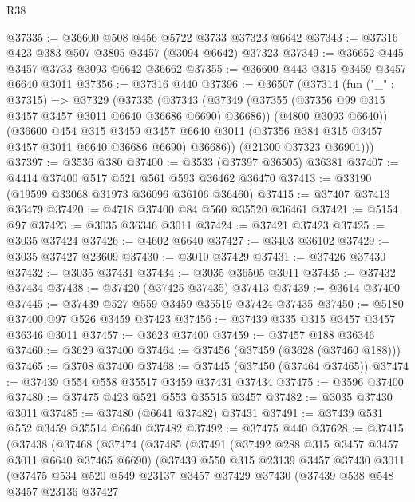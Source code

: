 \begin{lexlean}{R38}
\begin{coremodule}
@37335 := @36600 @508 @456 @5722 @3733 @37323 @6642
@37343 := @37316 @423 @383 @507 @3805 @3457 (@3094 @6642) @37323
@37349 := @36652 @445 @3457 @3733 @3093 @6642 @36662
@37355 := @36600 @443 @315 @3459 @3457 @6640 @3011
@37356 := @37316 @440
@37396 := @36507
    (@37314
      (fun ("_" : @37315) =>
      @37329
        (@37335
          (@37343
            (@37349 (@37355 (@37356 @99 @315 @3457 @3457 @3011 @6640 @36686 @6690) @36686))
            (@4800 @3093 @6640))
          (@36600
            @454
            @315
            @3459
            @3457
            @6640
            @3011
            (@37356 @384 @315 @3457 @3457 @3011 @6640 @36686 @6690)
            @36686))
        (@21300 @37323 @36901)))
@37397 := @3536 @380
@37400 := @3533 (@37397 @36505) @36381
@37407 := @4414 @37400 @517 @521 @561 @593 @36462 @36470
@37413 := @33190 (@19599 @33068 @31973 @36096 @36106 @36460)
@37415 := @37407 @37413 @36479
@37420 := @4718 @37400 @84 @560 @35520 @36461
@37421 := @5154 @97
@37423 := @3035 @36346 @3011
@37424 := @37421 @37423
@37425 := @3035 @37424
@37426 := @4602 @6640
@37427 := @3403 @36102
@37429 := @3035 @37427 @23609
@37430 := @3010 @37429
@37431 := @37426 @37430
@37432 := @3035 @37431
@37434 := @3035 @36505 @3011
@37435 := @37432 @37434
@37438 := @37420 (@37425 @37435) @37413
@37439 := @3614 @37400
@37445 := @37439 @527 @559 @3459 @35519 @37424 @37435
@37450 := @5180 @37400 @97 @526 @3459 @37423
@37456 := @37439 @335 @315 @3457 @3457 @36346 @3011
@37457 := @3623 @37400
@37459 := @37457 @188 @36346
@37460 := @3629 @37400
@37464 := @37456 (@37459 (@3628 (@37460 @188)))
@37465 := @3708 @37400
@37468 := @37445 (@37450 (@37464 @37465))
@37474 := @37439 @554 @558 @35517 @3459 @37431 @37434
@37475 := @3596 @37400
@37480 := @37475 @423 @521 @553 @35515 @3457
@37482 := @3035 @37430 @3011
@37485 := @37480 (@6641 @37482) @37431
@37491 := @37439 @531 @552 @3459 @35514 @6640 @37482
@37492 := @37475 @440
@37628 := @37415
    (@37438
      (@37468
        (@37474
          (@37485
            (@37491
              (@37492 @288 @315 @3457 @3457 @3011 @6640 @37465 @6690)
              (@37439
                @550
                @315
                @23139
                @3457
                @37430
                @3011
                (@37475
                  @534
                  @520
                  @549
                  @23137
                  @3457
                  @37429
                  @37430
                  (@37439
                    @538
                    @548
                    @3457
                    @23136
                    @37427

\end{coremodule}
\end{lexlean}
